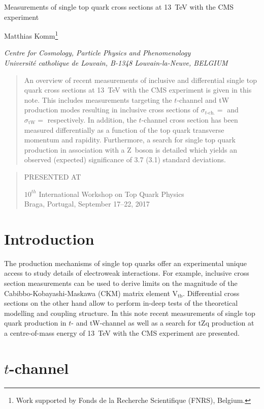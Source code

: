 \documentclass[12pt]{article}
\newcommand\pubnumber{}
\newcommand\pubdate{\today}
\def\institute{Centre for Cosmology, Particle Physics and Phenomenology\\
Universit\'e catholique de Louvain, B-1348 Louvain-la-Neuve, BELGIUM}
\def\support{\footnote{Work supported by Fonds de la Recherche Scientifique (FNRS), Belgium.}}
\def\Title#1{\begin{center} {\Large #1 } \end{center}}
\def\Author#1{\begin{center}{ \sc #1} \end{center}}
\def\Address#1{\begin{center}{ \it #1} \end{center}}
\newcommand\pubblock{\rightline{\begin{tabular}{l} \pubnumber\\
         \pubdate  \end{tabular}}}
\newenvironment{Abstract}{\begin{quotation}  }{\end{quotation}}
\newenvironment{Presented}{\begin{quotation} \begin{center} 
             PRESENTED AT\end{center}\bigskip 
      \begin{center}\begin{large}}{\end{large}\end{center} \end{quotation}}
\begin{document}
\begin{titlepage}
\pubblock

\vfill
\Title{Measurements of single top quark cross sections at 13~TeV with the CMS experiment}
\vfill
\Author{Matthias Komm\support}
\Address{\institute}
\vfill
\begin{Abstract}
An overview of recent measurements of inclusive and differential single top quark cross sections at 13~TeV with the CMS experiment is given in this note. This includes measurements targeting the $t$-channel and tW production modes resulting in inclusive cross sections of $\sigma_{t\mathrm{\mbox{-}ch.}}=$ and $\sigma_\mathrm{tW}=$ respectively. In addition, the $t$-channel cross section has been measured differentially as a function of the top quark transverse momentum and rapidity. Furthermore, a search for single top quark production in association with a Z~boson is detailed which yields an observed (expected) significance of 3.7 (3.1) standard deviations. 
\end{Abstract}
\vfill
\begin{Presented}
$10^{th}$ International Workshop on Top Quark Physics\\
Braga, Portugal,  September 17--22, 2017
\end{Presented}
\vfill
\end{titlepage}
\def\thefootnote{\fnsymbol{footnote}}
\setcounter{footnote}{0}
%

\section{Introduction}

The production mechanisms of single top quarks offer an experimental unique access to study details of electroweak interactions. For example, inclusive cross section measurements can be used to derive limits on the magnitude of the Cabibbo-Kobayashi-Maskawa (CKM) matrix element $\mathrm{V}_\mathrm{tb}$. Differential cross sections on the other hand allow to perform in-deep tests of the theoretical modelling and coupling structure. In this note recent measurements of single top quark production in $t$- and tW-channel as well as a search for tZq production at a centre-of-mass energy of 13~TeV with the CMS experiment are presented.

\section{$t$-channel}
\end{document}
